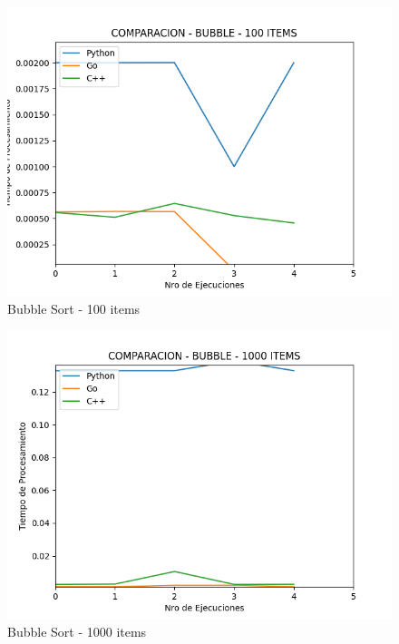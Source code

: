 \documentclass[12pt]{article} %
\begin{document}
\vspace{9mm}


\begin{figure}[H]
    \centering
    \includegraphics[width=\textwidth]{bubble_100}
    \caption{Bubble Sort - 100 items}
    \end{figure}
    
    \vspace{5mm}
    
    \begin{figure}[H]
    \centering
    \includegraphics[width=\textwidth]{bubble_1000}
    \caption{Bubble Sort - 1000 items}
    \end{figure}
    
    \vspace{5mm}
    
\end{document}
